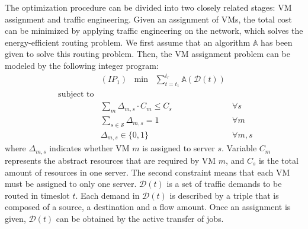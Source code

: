\documentclass[journal,single-space,two column,twoside,10pt]{IEEEtran}
\begin{document}
The optimization procedure can be divided into two closely related stages: VM assignment and traffic engineering. Given an assignment of VMs, the total cost can be minimized by applying traffic engineering on the network, which solves the energy-efficient routing problem. We first assume that an algorithm $\mathbb{A}$ has been given to solve this routing problem. Then, the VM assignment problem can be modeled by the following integer program:
\begin{equation}
	\begin{array}{lll}
		& (IP_1) \;\; \min \;\; \sum_{t = t_1}^{t_{r}} \mathbb{A}(\mathcal{D}(t)) \nonumber \\
		\mbox{ subject to} \nonumber\\
		& \sum_m \Delta_{m,s} \cdot C_m \le C_s & \forall s  \nonumber \\
		& \sum_{s \in \mathcal{S}} \Delta_{m,s} = 1 & \forall m \nonumber \\
		& \Delta_{m,s} \in \{0,1\} & \forall m,s  \nonumber
	\end{array}
	\nonumber
\end{equation}
where $\Delta_{m,s}$ indicates whether VM $m$ is assigned to server $s$. Variable $C_m$ represents the abstract resources that are required by VM $m$, and $C_s$ is the total amount of resources in one server. The second constraint means that each VM must be assigned to only one server. $\mathcal{D}(t)$ is a set of traffic demands to be routed in timeslot $t$. Each demand in $\mathcal{D}(t)$ is described by a triple that is composed of a source, a destination and a flow amount. Once an assignment is given, $\mathcal{D}(t)$ can be obtained by the active transfer of jobs.
\end{document}
